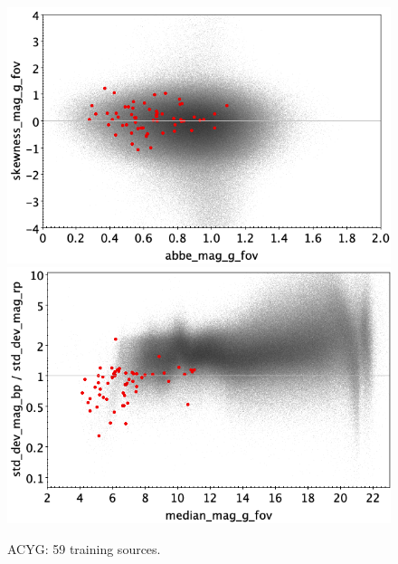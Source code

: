 \documentclass[longauth]{aa}
\begin{document}
\begin{appendix}
\begin{figure}
\vspace{4mm}
 \includegraphics[width=0.45\hsize]{figures/appendix/ACYG_trn_ask.png}  %
\hspace{2mm}
 \includegraphics[width=0.45\hsize]{figures/appendix/ACYG_trn_msdr.png}  \\ %
\vspace{4mm}
 \caption{ACYG: 59 training sources.}  
 \label{fig:app:ACYG_trn}
\end{figure}


\end{appendix}
\end{document}
